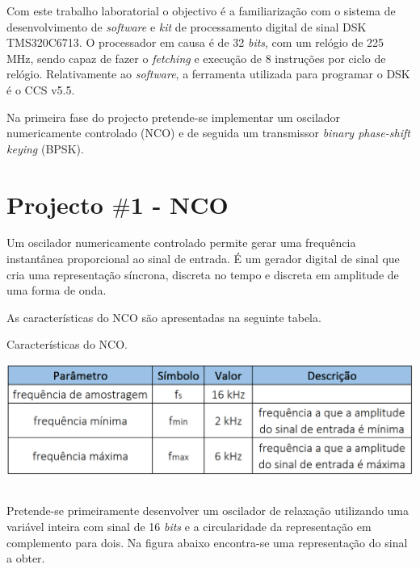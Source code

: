 \documentclass[11pt]{article}
\numberwithin{equation}{section}
\begin{document}
Com este trabalho laboratorial o objectivo é a familiarização com o sistema de desenvolvimento de \textit{software} e \textit{kit} de processamento digital de sinal DSK TMS320C6713. O processador em causa é de 32 \textit{bits}, com um relógio de 225 MHz, sendo capaz de fazer o \textit{fetching} e execução de 8 instruções por ciclo de relógio. Relativamente ao \textit{software}, a ferramenta utilizada para programar o DSK é o CCS v5.5.

Na primeira fase do projecto pretende-se implementar um oscilador numericamente controlado (NCO) e de seguida um transmissor \textit{binary phase-shift keying} (BPSK).

\section{Projecto $\#$1 - NCO}

Um oscilador numericamente controlado permite gerar uma frequência instantânea proporcional ao sinal de entrada. É um gerador digital de sinal que cria uma representação síncrona, discreta no tempo e discreta em amplitude de uma forma de onda.

As características do NCO são apresentadas na seguinte tabela.

\begin{table}[H]
	\centering
	\caption{Características do NCO.}
	\vspace{-1.5mm}
	\includegraphics[keepaspectratio=true, scale=0.45]{tabelas/tabela1}
\end{table}

\subsection{} %

Pretende-se primeiramente desenvolver um oscilador de relaxação utilizando uma variável inteira com sinal de 16 \textit{bits} e a circularidade da representação em complemento para dois. Na figura abaixo encontra-se uma representação do sinal a obter.
\end{document}
